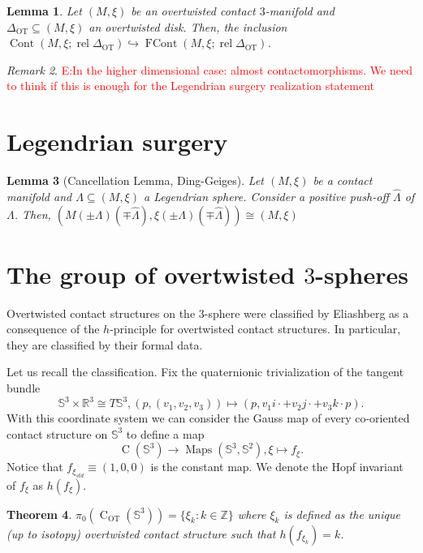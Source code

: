 \documentclass[11pt]{amsart}
\theoremstyle{plain}
\newtheorem{theorem}{Theorem}
\newtheorem{lemma}[theorem]{Lemma}
\theoremstyle{definition}
\theoremstyle{remark}
\newtheorem{remark}[theorem]{Remark}
\numberwithin{theorem}{section}
\newcommand{\R}{\mathbb{R}}           %
\newcommand{\Z}{\mathbb{Z}}           %
\newcommand{\NS}{{\mathbb{S}}}
\newcommand{\rel}{\operatorname{rel}}
\newcommand{\Maps}{\operatorname{Maps}}
\newcommand{\Cont}{\operatorname{Cont}}
\newcommand{\FCont}{\operatorname{FCont}}
\newcommand{\C}{\operatorname{C}}
\newcommand{\OT}{\operatorname{OT}}
\begin{document}
\begin{lemma}\label{lem:FormalContact3D}
Let $(M,\xi)$ be an overtwisted contact $3$-manifold and $\Delta_{\OT}\subseteq (M,\xi)$ an overtwisted disk. Then, the inclusion $\Cont(M,\xi;\rel \Delta_{\OT})\hookrightarrow \FCont(M,\xi;\rel \Delta_{\OT})$.
\end{lemma}
\begin{remark}
    \textcolor{red}{E:In the higher dimensional case: almost contactomorphisms. We need to think if this is enough for the Legendrian surgery realization statement}
\end{remark}

\section{Legendrian surgery}

\begin{lemma}[Cancellation Lemma, Ding-Geiges] \label{lem:Cancellation}
Let $(M,\xi)$ be a contact manifold and $\Lambda\subseteq (M,\xi)$ a Legendrian sphere. Consider a positive push-off $\hat{\Lambda}$ of $\Lambda$. Then, $(M(\pm\Lambda)(\mp\hat{\Lambda}),\xi(\pm\Lambda)(\mp\hat{\Lambda}))\cong (M,\xi)$
\end{lemma}

\section{The group of overtwisted $3$-spheres}

Overtwisted contact structures on the $3$-sphere were classified by Eliashberg as a consequence of the $h$-principle for overtwisted contact structures. In particular, they are classified by their formal data. 

Let us recall the classification. Fix the quaternionic trivialization of the tangent bundle $$\NS^3\times \R^3\cong T\NS^3,(p,(v_1,v_2,v_3))\mapsto (p, v_1 i\cdotp +v_2 j\cdotp +v_3 k\cdot p).$$ With this coordinate system we can consider the Gauss map of every co-oriented contact structure on $\NS^3$ to define a map $$\C(\NS^3)\rightarrow \Maps(\NS^3,\NS^2),\xi\mapsto f_\xi.$$ Notice that $f_{\xi_{std}}\equiv (1,0,0)$ is the constant map. We denote the Hopf invariant of $f_\xi$ as $h(f_\xi)$.

\begin{theorem}
    $\pi_0(\C_{\OT}(\NS^3))=\{\xi_k:k\in \Z\}$ where $\xi_k$ is defined as the unique (up to isotopy) overtwisted contact structure such that $h(f_{\xi_k})=k$.
\end{theorem}
\end{document}
